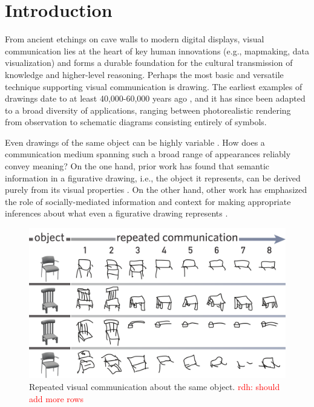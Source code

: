 \documentclass[10pt,letterpaper]{article}
\newcommand{\rdh}[1]{\textcolor{Red}{rdh: #1}}
\begin{document}
\section{Introduction}

From ancient etchings on cave walls to modern digital displays, visual communication lies at the heart of key human innovations (e.g., mapmaking, data visualization) and forms a durable foundation for the cultural transmission of knowledge and higher-level reasoning. 
Perhaps the most basic and versatile technique supporting visual communication is drawing.
The earliest examples of drawings date to at least 40,000-60,000 years ago \cite{hoffmann2018u,Aubert:2014jy}, and it has since been adapted to a broad diversity of applications, ranging between photorealistic rendering from observation to schematic diagrams consisting entirely of symbols. 

Even drawings of the same object can be highly variable .
How does a communication medium spanning such a broad range of appearances reliably convey meaning? 
On the one hand, prior work has found that semantic information in a figurative drawing, i.e., the object it represents, can be derived purely from its visual properties \cite{FanCommon2018}. 
On the other hand, other work has emphasized the role of socially-mediated information and context for making appropriate inferences about what even a figurative drawing represents \cite{goodman1976languages,gombrich1969art}.

\begin{figure}
\includegraphics[width=\linewidth]{figures/sketch_gallery.pdf}
\caption{Repeated visual communication about the same object. \rdh{should add more rows}}
\label{sketch_gallery}
\end{figure}
\end{document}
